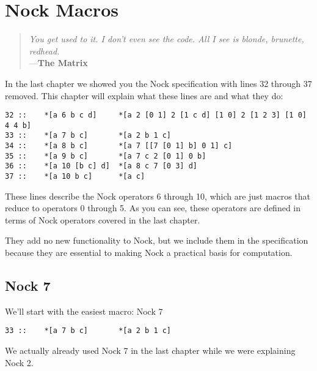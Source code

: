 \chapter{Nock Macros}

\label{cha:nock_macros}

\begin{quote}
\noindent \emph{You get used to it. I don't even see the code.
All I see is blonde, brunette, redhead.}
\medskip \\
---\textbf{The Matrix}
\end{quote}

In the last chapter we showed you the Nock specification with lines 32 through 37 removed.
This chapter will explain what these lines are and what they do:

\begin{framed_shaded}
\begin{Verbatim}[fontsize=\relsize{-2.5},commandchars=\\\{\}]
32 ::    *[a 6 b c d]     *[a 2 [0 1] 2 [1 c d] [1 0] 2 [1 2 3] [1 0] 4 4 b]
33 ::    *[a 7 b c]       *[a 2 b 1 c]
34 ::    *[a 8 b c]       *[a 7 [[7 [0 1] b] 0 1] c]
35 ::    *[a 9 b c]       *[a 7 c 2 [0 1] 0 b]
36 ::    *[a 10 [b c] d]  *[a 8 c 7 [0 3] d]
37 ::    *[a 10 b c]      *[a c]
\end{Verbatim}
\end{framed_shaded}

These lines describe the Nock operators 6 through 10, which are just macros that reduce to operators 0 through 5. As you can see, these operators are defined in terms of Nock operators covered in the last chapter.

They add no new functionality to Nock, but we include them in the specification because they are essential to making Nock a practical basis for computation.

\section{Nock 7}

We'll start with the easiest macro: Nock 7

\begin{framed_shaded}
\begin{Verbatim}[fontsize=\relsize{-2.5},commandchars=\\\{\}]
33 ::    *[a 7 b c]       *[a 2 b 1 c]
\end{Verbatim}
\end{framed_shaded}
We actually already used Nock 7 in the last chapter while we were explaining Nock 2.

